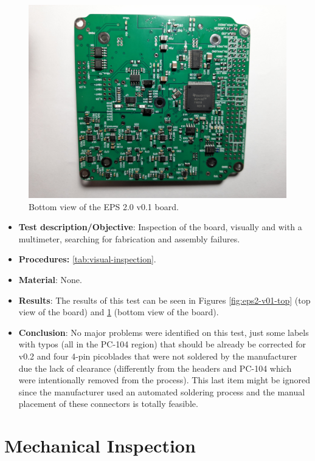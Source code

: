 \begin{figure}[!ht]
    \begin{center}
        \includegraphics[width=0.75\columnwidth]{figures/v01/eps2-v01-bottom.jpg}
        \caption{Bottom view of the EPS 2.0 v0.1 board.}
        \label{fig:eps2-v01-bottom}
    \end{center}
\end{figure}

\begin{itemize}
    \item \textbf{Test description/Objective}: Inspection of the board, visually and with a multimeter, searching for fabrication and assembly failures.
    \item \textbf{Procedures:} \autoref{tab:visual-inspection}.
    \item \textbf{Material}: None.
    \item \textbf{Results}: The results of this test can be seen in Figures \ref{fig:eps2-v01-top} (top view of the board) and \ref{fig:eps2-v01-bottom} (bottom view of the board).
    \item \textbf{Conclusion}: No major problems were identified on this test, just some labels with typos (all in the PC-104 region) that should be already be corrected for v0.2 and four 4-pin picoblades that were not soldered by the manufacturer due the lack of clearance (differently from the headers and PC-104 which were intentionally removed from the process). This last item might be ignored since the manufacturer used an automated soldering process and the manual placement of these connectors is totally feasible.  
\end{itemize}

\section{Mechanical Inspection}

